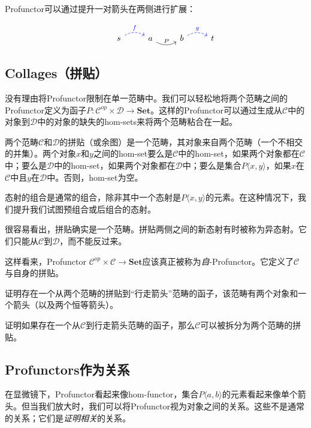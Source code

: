 \documentclass[DaoFP]{subfiles}
\begin{document}
Profunctor可以通过提升一对箭头在两侧进行扩展：

\[
 \begin{tikzcd}
  & s
  \arrow[r, bend left, dashed, blue, "f"]
 & a
 \arrow[r, bend right, "P"]
 & b
  \arrow[r, bend left, dashed, blue, "g"]
 &  t
  \end{tikzcd}
\]

\subsection{Collages（拼贴）}

没有理由将Profunctor限制在单一范畴中。我们可以轻松地将两个范畴之间的Profunctor定义为函子$ P \colon \mathcal{C}^{op} \times  \mathcal{D} \to \mathbf{Set}$。这样的Profunctor可以通过生成从$\mathcal{C}$中的对象到$\mathcal{D}$中的对象的缺失的hom-sets来将两个范畴粘合在一起。

两个范畴$\mathcal{C}$和$\mathcal{D}$的拼贴（或余图）是一个范畴，其对象来自两个范畴（一个不相交的并集）。两个对象$x$和$y$之间的hom-set要么是$\mathcal{C}$中的hom-set，如果两个对象都在$\mathcal{C}$中；要么是$\mathcal{D}$中的hom-set，如果两个对象都在$\mathcal{D}$中；要么是集合$P \langle x, y\rangle$，如果$x$在$\mathcal{C}$中且$y$在$\mathcal{D}$中。否则，hom-set为空。

态射的组合是通常的组合，除非其中一个态射是$P \langle x, y \rangle$的元素。在这种情况下，我们提升我们试图预组合或后组合的态射。

很容易看出，拼贴确实是一个范畴。拼贴两侧之间的新态射有时被称为异态射。它们只能从$\mathcal{C}$到$\mathcal{D}$，而不能反过来。

这样看来，Profunctor $ \mathcal{C}^{op} \times  \mathcal{C} \to \mathbf{Set}$应该真正被称为\emph{自}-Profunctor。它定义了$\mathcal{C}$与自身的拼贴。

\begin{exercise}
证明存在一个从两个范畴的拼贴到“行走箭头”范畴的函子，该范畴有两个对象和一个箭头（以及两个恒等箭头）。
\end{exercise}
\begin{exercise}
证明如果存在一个从$\mathcal{C}$到行走箭头范畴的函子，那么$\mathcal{C}$可以被拆分为两个范畴的拼贴。
\end{exercise}

\subsection{Profunctors作为关系}

在显微镜下，Profunctor看起来像hom-functor，集合$P \langle a, b \rangle$的元素看起来像单个箭头。但当我们放大时，我们可以将Profunctor视为对象之间的关系。这些不是通常的关系；它们是\emph{证明相关}的关系。
\end{document}
